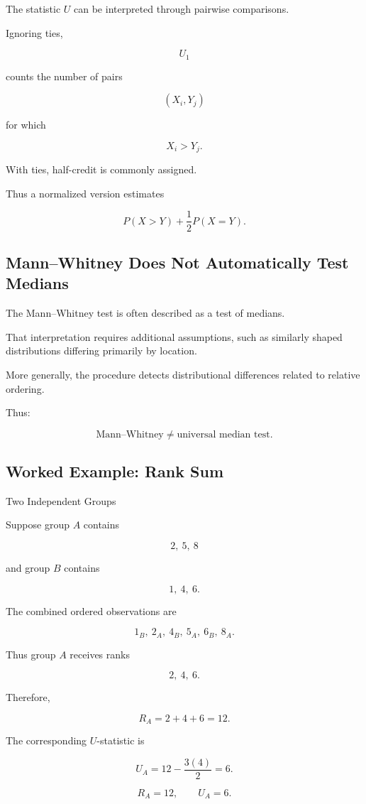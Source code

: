 The statistic \(U\) can be interpreted through pairwise comparisons.

Ignoring ties,

\[
U_1
\]

counts the number of pairs

\[
(X_i,Y_j)
\]

for which

\[
X_i>Y_j.
\]

With ties, half-credit is commonly assigned.

Thus a normalized version estimates

\[
\boxed{
P(X>Y)
+
\frac12P(X=Y).
}
\]

\subsection{Mann--Whitney Does Not Automatically Test Medians}
\label{subsec:mann-whitney-not-median}

The Mann--Whitney test is often described as a test of medians.

That interpretation requires additional assumptions, such as similarly
shaped distributions differing primarily by location.

More generally, the procedure detects distributional differences related
to relative ordering.

Thus:

\[
\boxed{
\text{Mann--Whitney}
\neq
\text{universal median test}.
}
\]

\subsection{Worked Example: Rank Sum}
\label{subsec:worked-rank-sum}

\begin{workedexamplebox}{Two Independent Groups}

Suppose group \(A\) contains

\[
2,\ 5,\ 8
\]

and group \(B\) contains

\[
1,\ 4,\ 6.
\]

The combined ordered observations are

\[
1_B,\ 2_A,\ 4_B,\ 5_A,\ 6_B,\ 8_A.
\]

Thus group \(A\) receives ranks

\[
2,\ 4,\ 6.
\]

Therefore,

\[
R_A
=
2+4+6
=
12.
\]

The corresponding \(U\)-statistic is

\[
U_A
=
12
-
\frac{
3(4)
}{2}
=
6.
\]

\begin{answerbox}
\[
\boxed{
R_A=12,
\qquad
U_A=6.
}
\]
\end{answerbox}

\end{workedexamplebox}

